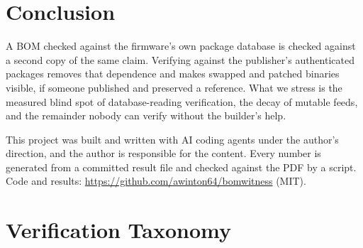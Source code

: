 \documentclass[sigconf,nonacm]{acmart}
\begin{document}
\section{Conclusion}

A BOM checked against the firmware's own package database is checked against a second copy of the same claim. Verifying against the publisher's authenticated packages removes that dependence and makes swapped and patched binaries visible, if someone published and preserved a reference. What we stress is the measured blind spot of database-reading verification, the decay of mutable feeds, and the remainder nobody can verify without the builder's help.

\begin{acks}
This project was built and written with AI coding agents under the author's direction, and the author is responsible for the content. Every number is generated from a committed result file and checked against the PDF by a script. Code and results: \url{https://github.com/awinton64/bomwitness} (MIT).
\end{acks}




\appendix

\section{Verification Taxonomy}
\label{app:taxonomy}
\end{document}
